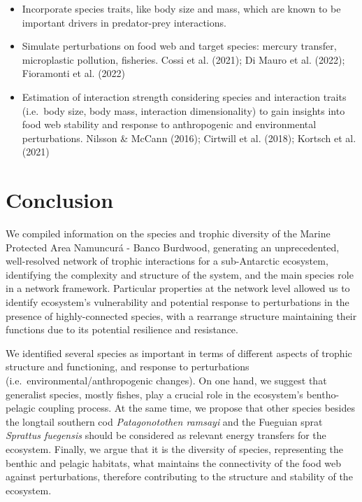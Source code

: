 \documentclass[preprint, 3p,
authoryear]{elsarticle} %
\begin{document}
\begin{itemize}
\item
  Incorporate species traits, like body size and mass, which are known
  to be important drivers in predator-prey interactions.
\item
  Simulate perturbations on food web and target species: mercury
  transfer, microplastic pollution, fisheries. Cossi et al. (2021); Di
  Mauro et al. (2022); Fioramonti et al. (2022)
\item
  Estimation of interaction strength considering species and interaction
  traits (i.e.~body size, body mass, interaction dimensionality) to gain
  insights into food web stability and response to anthropogenic and
  environmental perturbations. Nilsson \& McCann (2016); Cirtwill et al.
  (2018); Kortsch et al. (2021)
\end{itemize}

\hypertarget{conclusion}{%
\section{Conclusion}\label{conclusion}}

We compiled information on the species and trophic diversity of the
Marine Protected Area Namuncurá - Banco Burdwood, generating an
unprecedented, well-resolved network of trophic interactions for a
sub-Antarctic ecosystem, identifying the complexity and structure of the
system, and the main species role in a network framework. Particular
properties at the network level allowed us to identify ecosystem's
vulnerability and potential response to perturbations in the presence of
highly-connected species, with a rearrange structure maintaining their
functions due to its potential resilience and resistance.

We identified several species as important in terms of different aspects
of trophic structure and functioning, and response to perturbations
(i.e.~environmental/anthropogenic changes). On one hand, we suggest that
generalist species, mostly fishes, play a crucial role in the
ecosystem's bentho-pelagic coupling process. At the same time, we
propose that other species besides the longtail southern cod
\emph{Patagonotothen ramsayi} and the Fueguian sprat \emph{Sprattus
fuegensis} should be considered as relevant energy transfers for the
ecosystem. Finally, we argue that it is the diversity of species,
representing the benthic and pelagic habitats, what maintains the
connectivity of the food web against perturbations, therefore
contributing to the structure and stability of the ecosystem.
\end{document}
